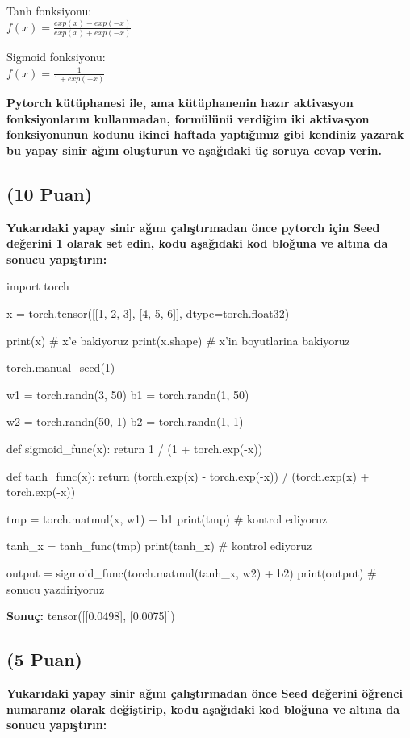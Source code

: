 \documentclass[11pt]{article}
\begin{document}
Tanh fonksiyonu:\\
$f(x) = \frac{exp(x) - exp(-x)}{exp(x) + exp(-x)}$
\vspace{.2in}

Sigmoid fonksiyonu:\\
$f(x) = \frac{1}{1 + exp(-x)}$

\vspace{.2in}
 \textbf{Pytorch kütüphanesi ile, ama kütüphanenin hazır aktivasyon fonksiyonlarını kullanmadan, formülünü verdiğim iki aktivasyon fonksiyonunun kodunu ikinci haftada yaptığımız gibi kendiniz yazarak bu yapay sinir ağını oluşturun ve aşağıdaki üç soruya cevap verin.}
 
\subsection{(10 Puan)} \textbf{Yukarıdaki yapay sinir ağını çalıştırmadan önce pytorch için Seed değerini 1 olarak set edin, kodu aşağıdaki kod bloğuna ve altına da sonucu yapıştırın:}

\begin{python}
import torch

x = torch.tensor([[1, 2, 3], [4, 5, 6]], dtype=torch.float32)

print(x) # x'e bakiyoruz
print(x.shape) # x'in boyutlarina bakiyoruz

torch.manual_seed(1)

w1 = torch.randn(3, 50)
b1 = torch.randn(1, 50)

w2 = torch.randn(50, 1)
b2 = torch.randn(1, 1)

def sigmoid_func(x):
    return 1 / (1 + torch.exp(-x))

def tanh_func(x):
    return (torch.exp(x) - torch.exp(-x)) / (torch.exp(x) + torch.exp(-x))

tmp = torch.matmul(x, w1) + b1
print(tmp)  # kontrol ediyoruz

tanh_x = tanh_func(tmp)
print(tanh_x) # kontrol ediyoruz

output = sigmoid_func(torch.matmul(tanh_x, w2) + b2)
print(output) # sonucu yazdiriyoruz
\end{python}

\textbf{Sonuç:} tensor([[0.0498], [0.0075]])

\subsection{(5 Puan)} \textbf{Yukarıdaki yapay sinir ağını çalıştırmadan önce Seed değerini öğrenci numaranız olarak değiştirip, kodu aşağıdaki kod bloğuna ve altına da sonucu yapıştırın:}
\end{document}
